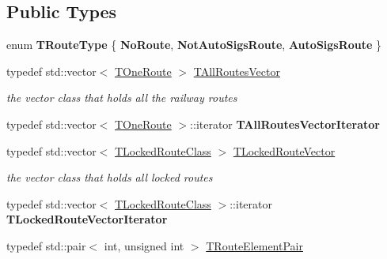 \subsection*{Public Types}
\begin{DoxyCompactItemize}
\item 
\mbox{\label{class_t_all_routes_af94f31040cc7692c777123c609d4cbd6}} 
enum {\bfseries T\+Route\+Type} \{ {\bfseries No\+Route}, 
{\bfseries Not\+Auto\+Sigs\+Route}, 
{\bfseries Auto\+Sigs\+Route}
 \}
\item 
\mbox{\label{class_t_all_routes_a34636f74b522ec911900fce48ea6667c}} 
typedef std\+::vector$<$ \mbox{\hyperlink{class_t_one_route}{T\+One\+Route}} $>$ \mbox{\hyperlink{class_t_all_routes_a34636f74b522ec911900fce48ea6667c}{T\+All\+Routes\+Vector}}
\begin{DoxyCompactList}\small\item\em the vector class that holds all the railway routes \end{DoxyCompactList}\item 
\mbox{\label{class_t_all_routes_a863ba954ac5b7e2197ae1074cc7e268b}} 
typedef std\+::vector$<$ \mbox{\hyperlink{class_t_one_route}{T\+One\+Route}} $>$\+::iterator {\bfseries T\+All\+Routes\+Vector\+Iterator}
\item 
\mbox{\label{class_t_all_routes_a00c2d57382ed6560f1c611bdfddc3a6f}} 
typedef std\+::vector$<$ \mbox{\hyperlink{class_t_all_routes_1_1_t_locked_route_class}{T\+Locked\+Route\+Class}} $>$ \mbox{\hyperlink{class_t_all_routes_a00c2d57382ed6560f1c611bdfddc3a6f}{T\+Locked\+Route\+Vector}}
\begin{DoxyCompactList}\small\item\em the vector class that holds all locked routes \end{DoxyCompactList}\item 
\mbox{\label{class_t_all_routes_ac58b6335a806c347545f73f680b45afa}} 
typedef std\+::vector$<$ \mbox{\hyperlink{class_t_all_routes_1_1_t_locked_route_class}{T\+Locked\+Route\+Class}} $>$\+::iterator {\bfseries T\+Locked\+Route\+Vector\+Iterator}
\item 
typedef std\+::pair$<$ int, unsigned int $>$ \mbox{\hyperlink{class_t_all_routes_a159a7d547e3d435d109a36cb41193a78}{T\+Route\+Element\+Pair}}

\end{DoxyCompactItemize}
